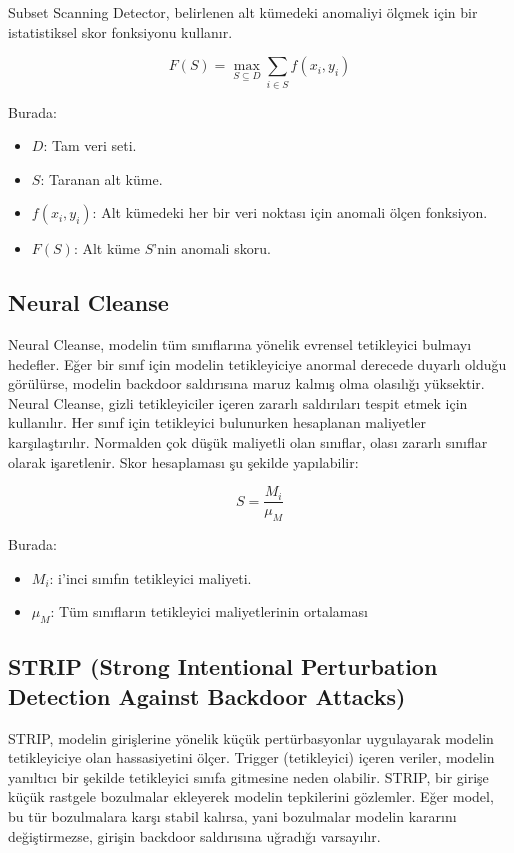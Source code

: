 Subset Scanning Detector, belirlenen alt kümedeki anomaliyi ölçmek için bir istatistiksel skor fonksiyonu kullanır.

\[ F(S) = \max_{S \subseteq D} \sum_{i \in S} f(x_i, y_i) \]

Burada:

\begin{itemize}
    \item $D$: Tam veri seti.
    \item $S$: Taranan alt küme.
    \item $f(x_i, y_i)$: Alt kümedeki her bir veri noktası için anomali ölçen fonksiyon.
    \item $F(S)$: Alt küme $S$'nin anomali skoru.
\end{itemize}

\newpage

\subsection{Neural Cleanse}

Neural Cleanse, modelin tüm sınıflarına yönelik evrensel tetikleyici bulmayı hedefler. Eğer bir sınıf için modelin tetikleyiciye anormal derecede duyarlı olduğu görülürse, modelin backdoor saldırısına maruz kalmış olma olasılığı yüksektir. Neural Cleanse, gizli tetikleyiciler içeren zararlı saldırıları tespit etmek için kullanılır.  Her sınıf için tetikleyici bulunurken hesaplanan maliyetler karşılaştırılır. Normalden çok düşük maliyetli olan sınıflar, olası zararlı sınıflar olarak işaretlenir. Skor hesaplaması şu şekilde yapılabilir:

\[ S = \frac{M_i}{\mu_M} \]

Burada:

\begin{itemize}
    \item $M_i$: i'inci sınıfın tetikleyici maliyeti.
    \item $\mu_M$: Tüm sınıfların tetikleyici maliyetlerinin ortalaması
\end{itemize}

\newpage

\subsection{STRIP (Strong Intentional Perturbation Detection Against Backdoor Attacks)}

STRIP, modelin girişlerine yönelik küçük pertürbasyonlar uygulayarak modelin tetikleyiciye olan hassasiyetini ölçer. Trigger (tetikleyici) içeren veriler, modelin yanıltıcı bir şekilde tetikleyici sınıfa gitmesine neden olabilir. STRIP, bir girişe küçük rastgele bozulmalar ekleyerek modelin tepkilerini gözlemler. Eğer model, bu tür bozulmalara karşı stabil kalırsa, yani bozulmalar modelin kararını değiştirmezse, girişin backdoor saldırısına uğradığı varsayılır.

